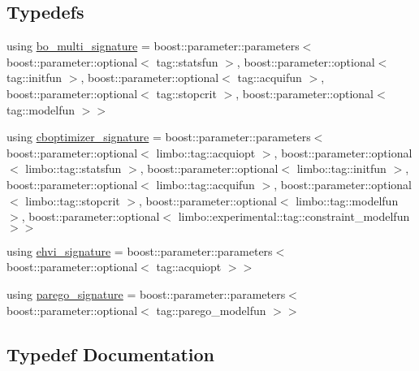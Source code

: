 \subsection*{Typedefs}
\begin{DoxyCompactItemize}
\item 
using \hyperlink{namespacelimbo_1_1experimental_1_1bayes__opt_a571329d2f0470956331c4fbdf32a2a6f}{bo\+\_\+multi\+\_\+signature} = boost\+::parameter\+::parameters$<$ boost\+::parameter\+::optional$<$ tag\+::statsfun $>$, boost\+::parameter\+::optional$<$ tag\+::initfun $>$, boost\+::parameter\+::optional$<$ tag\+::acquifun $>$, boost\+::parameter\+::optional$<$ tag\+::stopcrit $>$, boost\+::parameter\+::optional$<$ tag\+::modelfun $>$$>$
\item 
using \hyperlink{namespacelimbo_1_1experimental_1_1bayes__opt_ae227a617e3c612fe31b87959b23da719}{cboptimizer\+\_\+signature} = boost\+::parameter\+::parameters$<$ boost\+::parameter\+::optional$<$ limbo\+::tag\+::acquiopt $>$, boost\+::parameter\+::optional$<$ limbo\+::tag\+::statsfun $>$, boost\+::parameter\+::optional$<$ limbo\+::tag\+::initfun $>$, boost\+::parameter\+::optional$<$ limbo\+::tag\+::acquifun $>$, boost\+::parameter\+::optional$<$ limbo\+::tag\+::stopcrit $>$, boost\+::parameter\+::optional$<$ limbo\+::tag\+::modelfun $>$, boost\+::parameter\+::optional$<$ limbo\+::experimental\+::tag\+::constraint\+\_\+modelfun $>$$>$
\item 
using \hyperlink{namespacelimbo_1_1experimental_1_1bayes__opt_ae8eff4654db4ec2db25b12dcb2a18b52}{ehvi\+\_\+signature} = boost\+::parameter\+::parameters$<$ boost\+::parameter\+::optional$<$ tag\+::acquiopt $>$$>$
\item 
using \hyperlink{namespacelimbo_1_1experimental_1_1bayes__opt_acbfe5ad9b42be948de5ebb46bdc9dd01}{parego\+\_\+signature} = boost\+::parameter\+::parameters$<$ boost\+::parameter\+::optional$<$ tag\+::parego\+\_\+modelfun $>$$>$
\end{DoxyCompactItemize}


\subsection{Typedef Documentation}
